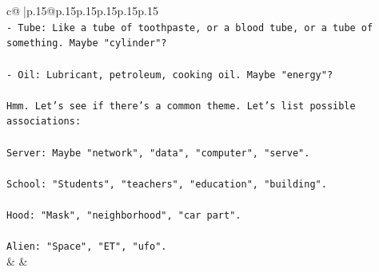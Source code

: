\documentclass{article}
\begin{document}
{\begin{supertabular}{c@{$\;$}|p{.15\linewidth}@{}p{.15\linewidth}p{.15\linewidth}p{.15\linewidth}p{.15\linewidth}p{.15\linewidth}}
{{{\\ 
\texttt{{-} Tube: Like a tube of toothpaste, or a blood tube, or a tube of something. Maybe "cylinder"?} \\
\\ 
\texttt{{-} Oil: Lubricant, petroleum, cooking oil. Maybe "energy"?} \\
\\ 
\texttt{Hmm. Let's see if there's a common theme. Let's list possible associations:} \\
\\ 
\texttt{Server: Maybe "network", "data", "computer", "serve".} \\
\\ 
\texttt{School: "Students", "teachers", "education", "building".} \\
\\ 
\texttt{Hood: "Mask", "neighborhood", "car part".} \\
\\ 
\texttt{Alien: "Space", "ET", "ufo".} \\
            }
        }
    }
    & & \\ \\


\end{supertabular}}
\end{document}
